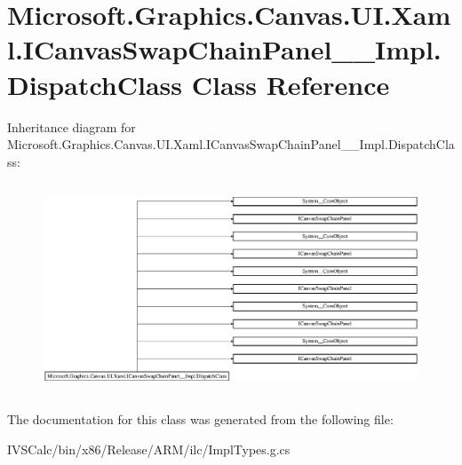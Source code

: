 \hypertarget{class_microsoft_1_1_graphics_1_1_canvas_1_1_u_i_1_1_xaml_1_1_i_canvas_swap_chain_panel_____impl_1_1_dispatch_class}{}\section{Microsoft.\+Graphics.\+Canvas.\+U\+I.\+Xaml.\+I\+Canvas\+Swap\+Chain\+Panel\+\_\+\+\_\+\+Impl.\+Dispatch\+Class Class Reference}
\label{class_microsoft_1_1_graphics_1_1_canvas_1_1_u_i_1_1_xaml_1_1_i_canvas_swap_chain_panel_____impl_1_1_dispatch_class}
Inheritance diagram for Microsoft.\+Graphics.\+Canvas.\+U\+I.\+Xaml.\+I\+Canvas\+Swap\+Chain\+Panel\+\_\+\+\_\+\+Impl.\+Dispatch\+Class\+:\begin{figure}[H]
\begin{center}
\leavevmode
\includegraphics[height=6.311476cm]{class_microsoft_1_1_graphics_1_1_canvas_1_1_u_i_1_1_xaml_1_1_i_canvas_swap_chain_panel_____impl_1_1_dispatch_class}
\end{center}
\end{figure}


The documentation for this class was generated from the following file\+:\begin{DoxyCompactItemize}
\item 
I\+V\+S\+Calc/bin/x86/\+Release/\+A\+R\+M/ilc/Impl\+Types.\+g.\+cs\end{DoxyCompactItemize}
